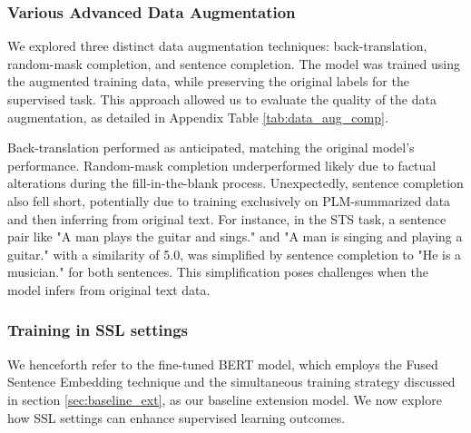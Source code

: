 \documentclass{article}
\begin{document}
\subsubsection{Various Advanced Data Augmentation}
\label{sec:var_data_aug}
We explored three distinct data augmentation techniques: back-translation, 
random-mask completion, and sentence completion. The model was trained using the 
augmented training data, while preserving the original labels for the supervised task. 
This approach allowed us to evaluate the quality of the data augmentation, as detailed 
in Appendix Table \ref{tab:data_aug_comp}.

Back-translation performed as anticipated, matching the original model's performance. 
Random-mask completion underperformed likely due to factual alterations during the fill-in-the-blank 
process. Unexpectedly, sentence completion also fell short, potentially due to training 
exclusively on PLM-summarized data and then inferring from original text. For instance, in the 
STS task, a sentence pair like "A man plays the guitar and sings." and "A man is singing and 
playing a guitar." with a similarity of 5.0, was simplified by sentence completion to "He is a 
musician." for both sentences. This simplification poses challenges when the model infers from 
original text data.

\subsubsection{Training in SSL settings}
We henceforth refer to the fine-tuned BERT model, which employs the Fused Sentence 
Embedding technique and the simultaneous 
training strategy discussed in section \ref{sec:baseline_ext}, 
as our baseline extension model. We now explore how SSL settings 
can enhance supervised learning outcomes.
\end{document}
